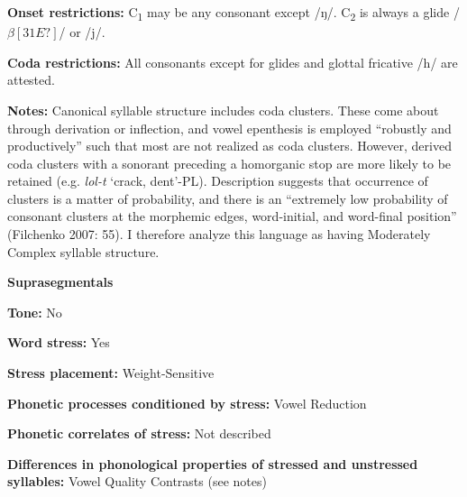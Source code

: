 \begin{styleBody}
\textbf{Onset restrictions: }C\textsubscript{1} may be any consonant except /ŋ/. C\textsubscript{2} is always a glide /$\beta [31E?]$/ or /j/.
\end{styleBody}

\begin{styleBody}
\textbf{Coda restrictions: }All consonants except for glides and glottal fricative /h/ are attested. 
\end{styleBody}

\begin{styleBody}
\textbf{Notes: }Canonical syllable structure includes coda clusters. These come about through derivation or inflection, and vowel epenthesis is employed “robustly and productively” such that most are not realized as coda clusters. However, derived coda clusters with a sonorant preceding a homorganic stop are more likely to be retained (e.g. \textit{lol-t} ‘crack, dent’-PL). Description suggests that occurrence of clusters is a matter of probability, and there is an “extremely low probability of consonant clusters at the morphemic edges, word-initial, and word-final position” (Filchenko 2007: 55). I therefore analyze this language as having Moderately Complex syllable structure.
\end{styleBody}

\begin{styleBody}
\textbf{Suprasegmentals}
\end{styleBody}

\begin{styleBody}
\textbf{Tone:} No
\end{styleBody}

\begin{styleBody}
\textbf{Word stress:} Yes
\end{styleBody}

\begin{styleBody}
\textbf{Stress placement:} Weight-Sensitive
\end{styleBody}

\begin{styleBody}
\textbf{Phonetic processes conditioned by stress:} Vowel Reduction
\end{styleBody}

\begin{styleBody}
\textbf{Phonetic correlates of stress: }Not described
\end{styleBody}

\begin{styleBody}
\textbf{Differences in phonological properties of stressed and unstressed syllables:} Vowel Quality Contrasts (see notes)
\end{styleBody}

